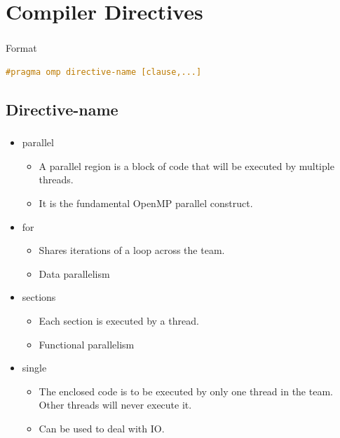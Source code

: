 \documentclass{beamer}
\begin{document}
	\section{Compiler Directives}
	\begin{frame}[fragile]
		\frametitle{\insertsection}
		\begin{block}{Format}
		\begin{lstlisting}[language=C++,numbers=none]
#pragma omp directive-name [clause,...]\end{lstlisting}\end{block}
\end{frame}
	\subsection{Directive-name}
	\begin{frame}
		\frametitle{\insertsubsection}
		\begin{itemize}
			\item parallel
				\begin{itemize}
					\item A parallel region is a block of code that will be executed by multiple threads.
					\item It is the fundamental OpenMP parallel construct.
				\end{itemize}
			\item for
				\begin{itemize}
					\item Shares iterations of a loop across the team.
					\item Data parallelism
				\end{itemize}
			\item sections
				\begin{itemize}
					\item Each section is executed by a thread.
					\item Functional parallelism
				\end{itemize}
			\item single
				\begin{itemize}
					\item The enclosed code is to be executed by only one thread in the team. Other threads will never execute it.
					\item Can be used to deal with IO.
				\end{itemize}
		\end{itemize}
	\end{frame}
\end{document}
